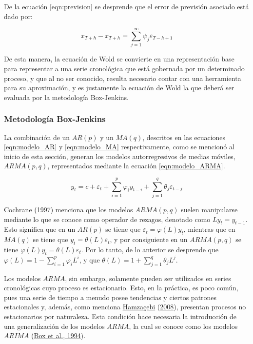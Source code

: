 \documentclass[
]{article}
\begin{document}
De la ecuación \ref{eqn:prevision} se desprende que el error de
previsión asociado está dado por:

\begin{equation}
\label{eqn:error_prevision}
x_{T+h}- \hat x_{T+h}=\sum_{j=1}^{\infty} \psi_j \varepsilon_{T-h+1}
\end{equation}

De esta manera, la ecuación de Wold se convierte en una representación
base para representar a una serie cronológica que está gobernada por un
determinado proceso, y que al no ser conocido, resulta necesario contar
con una herramienta para su aproximación, y es justamente la ecuación de
Wold la que deberá ser evaluada por la metodología Box-Jenkins.

\subsubsection{Metodología Box-Jenkins}

La combinación de un \(AR(p)\) y un \(MA(q)\), descritos en las
ecuaciones \ref{eqn:modelo_AR} y \ref{eqn:modelo_MA} respectivamente,
como se mencionó al inicio de esta sección, generan los modelos
autorregresivos de medias móviles, \(ARMA(p,q)\), representados mediante
la ecuación \ref{eqn:modelo_ARMA}.

\begin{equation}
\label{eqn:modelo_ARMA}
y_t=c+\varepsilon_t+\sum_{i=1}^p \varphi_iy_{t-i}+\sum_{j=1}^q \theta_j \varepsilon_{t-j}
\end{equation}

\protect\hyperlink{ref-Cochrane}{Cochrane}
(\protect\hyperlink{ref-Cochrane}{1997}) menciona que los modelos
\(ARMA(p,q)\) suelen manipularse mediante lo que se conoce como operador
de rezagos, denotado como \(Ly_t=y_{t-1}\). Esto significa que en un
\(AR(p)\) se tiene que \(\varepsilon_t=\varphi(L)y_t\), mientras que en
\(MA(q)\) se tiene que \(y_t=\theta(L)\varepsilon_t\), y por
consiguiente en un \(ARMA(p,q)\) se tiene
\(\varphi(L)y_t=\theta(L)\varepsilon_t\). Por lo tanto, de lo anterior
se desprende que \(\varphi(L)=1-\sum_{i=1}^p \varphi_iL^i\), y que
\(\theta(L)=1+\sum_{j=1}^q\theta_jL^j\).

Los modelos \(ARMA\), sin embargo, solamente pueden ser utilizados en
series cronológicas cuyo proceso es estacionario. Esto, en la práctica,
es poco común, pues una serie de tiempo a menudo posee tendencias y
ciertos patrones estacionales y, además, como menciona
\protect\hyperlink{ref-Hamzacebi}{Hamzaçebi}
(\protect\hyperlink{ref-Hamzacebi}{2008}), presentan procesos no
estacionarios por naturaleza. Esta condición hace necesaria la
introducción de una generalización de los modelos \(ARMA\), la cual se
conoce como los modelos \(ARIMA\)
(\protect\hyperlink{ref-box-jenkins}{Box et al., 1994}).
\end{document}
